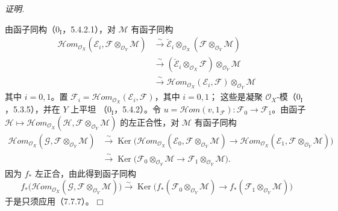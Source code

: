 \documentclass[UTF8,fontset=none,11pt,oneside,openany]{ctexbook}
\providecommand{\square}{\mdlgwhtsquare}
\newenvironment{proof}{%
  \par\smallskip\noindent\textit{证明.}\ %
}{\hfill$\square$\par}
\begin{document}
\begin{proof}
由函子同构（$0_{\mathrm I}$，5.4.2.1），对 $\mathscr M$ 有函子同构
\begin{align*}
  \mathscr{H}\!om_{\mathscr O_X}
    (\mathscr E_i,\mathscr F\otimes_{\mathscr O_Y}\mathscr M)
  &\xrightarrow{\sim}
  \check{\mathscr E}_i
    \otimes_{\mathscr O_X}
    (\mathscr F\otimes_{\mathscr O_Y}\mathscr M)\\
  &\xrightarrow{\sim}
  (\check{\mathscr E}_i\otimes_{\mathscr O_X}\mathscr F)
    \otimes_{\mathscr O_Y}\mathscr M\\
  &\xrightarrow{\sim}
  \mathscr{H}\!om_{\mathscr O_X}(\mathscr E_i,\mathscr F)
    \otimes_{\mathscr O_Y}\mathscr M
\end{align*}
其中 $i=0,1$。置
$\mathscr F_i=\mathscr{H}\!om_{\mathscr O_X}(\mathscr E_i,\mathscr F)$，其中
$i=0,1$；
这些是凝聚 $\mathscr O_X$-模（$0_{\mathrm I}$，5.3.5），并在 $Y$ 上平坦
（$0_{\mathrm I}$，5.4.2）。令
$u=\mathscr{H}\!om(v,1_{\mathscr F}):\mathscr F_0\to\mathscr F_1$。由函子
$\mathscr H\mapsto\mathscr{H}\!om_{\mathscr O_X}
(\mathscr H,\mathscr F\otimes_{\mathscr O_Y}\mathscr M)$ 的左正合性，对
$\mathscr M$ 有函子同构
\begin{align*}
  \mathscr{H}\!om_{\mathscr O_X}
    (\mathscr G,\mathscr F\otimes_{\mathscr O_Y}\mathscr M)
  &\xrightarrow{\sim}
  \operatorname{Ker}
  \bigl(
    \mathscr{H}\!om_{\mathscr O_X}
      (\mathscr E_0,\mathscr F\otimes_{\mathscr O_Y}\mathscr M)
    \longrightarrow
    \mathscr{H}\!om_{\mathscr O_X}
      (\mathscr E_1,\mathscr F\otimes_{\mathscr O_Y}\mathscr M)
  \bigr)\\
  &\xrightarrow{\sim}
  \operatorname{Ker}
  \bigl(
    \mathscr F_0\otimes_{\mathscr O_Y}\mathscr M
    \longrightarrow
    \mathscr F_1\otimes_{\mathscr O_Y}\mathscr M
  \bigr).
\end{align*}
因为 $f_*$ 左正合，由此得到函子同构
\[
  f_*
  \bigl(
    \mathscr{H}\!om_{\mathscr O_X}
      (\mathscr G,\mathscr F\otimes_{\mathscr O_Y}\mathscr M)
  \bigr)
  \xrightarrow{\sim}
  \operatorname{Ker}
  \bigl(
    f_*(\mathscr F_0\otimes_{\mathscr O_Y}\mathscr M)
    \longrightarrow
    f_*(\mathscr F_1\otimes_{\mathscr O_Y}\mathscr M)
  \bigr)
\]
于是只须应用（7.7.7）。
\end{proof}
\end{document}
